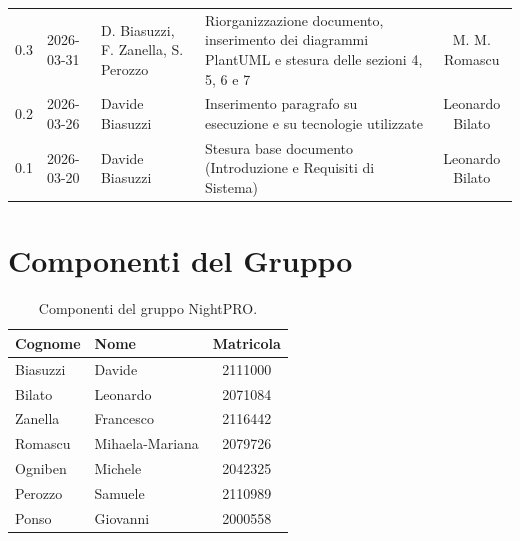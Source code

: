 \documentclass[a4paper, 11pt, oneside]{scrartcl}
\begin{document}
\begin{center}
{\begin{tabular}{@{}llp{}p{}c@{}}
            0.3               & 2026-03-31    & D. Biasuzzi, F. Zanella, S. Perozzo    & Riorganizzazione documento, inserimento dei diagrammi PlantUML e stesura delle sezioni 4, 5, 6 e 7 & M. M. Romascu\\
            0.2               & 2026-03-26    & Davide Biasuzzi   & Inserimento paragrafo su esecuzione e su tecnologie utilizzate & Leonardo Bilato       \\
            0.1               & 2026-03-20    & Davide Biasuzzi   & Stesura base documento (Introduzione e Requisiti di Sistema)   & Leonardo Bilato       \\
            \bottomrule
        \end{tabular}
    }
\end{center}

\newpage
\tableofcontents
\listoffigures
\listoftables
\pagestyle{fancy}

\newpage
\section*{Componenti del Gruppo}

\begin{table}[H]
    \centering
    \renewcommand{\arraystretch}{1.2}
    \begin{tabular}{@{}llc@{}}
        \toprule
        \textbf{Cognome} & \textbf{Nome}   & \textbf{Matricola} \\
        \midrule
        Biasuzzi         & Davide          & 2111000            \\
        Bilato           & Leonardo        & 2071084            \\
        Zanella          & Francesco       & 2116442            \\
        Romascu          & Mihaela-Mariana & 2079726            \\
        Ogniben          & Michele         & 2042325            \\
        Perozzo          & Samuele         & 2110989            \\
        Ponso            & Giovanni        & 2000558            \\
        \bottomrule
    \end{tabular}
    \caption{Componenti del gruppo NightPRO.}
\end{table}
\end{document}
